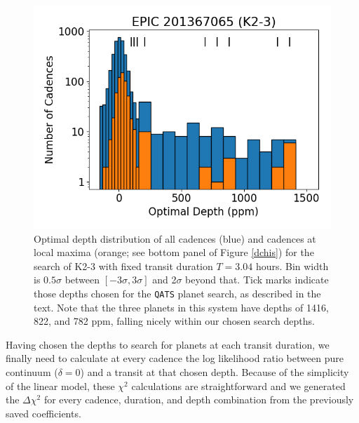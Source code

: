\documentclass[twocolumn]{aastex62}
\newcommand{\pipeline}[1]{\texttt{#1}}
\begin{document}
\begin{figure}[tbp]
\includegraphics[width=\columnwidth]{optimal_depths.png}
\caption{Optimal depth distribution of all cadences (blue) and
  cadences at local maxima (orange; see bottom panel of Figure
  \ref{dchis}) for the search of K2-3 with fixed transit duration
  $T=3.04$ hours. Bin width is $0.5\sigma$ between
  $[-3\sigma,3\sigma]$ and 2$\sigma$ beyond that.  Tick marks indicate
  those depths chosen for the \pipeline{QATS} planet search, as
  described in the text. Note that the three planets in this system
  have depths of 1416, 822, and 782 ppm, falling nicely within our
  chosen search depths.  \label{optdepths}}
\end{figure}

Having chosen the depths to search for planets at each transit
duration, we finally need to calculate at every cadence the log
likelihood ratio between pure continuum ($\delta = 0$) and a transit
at that chosen depth. Because of the simplicity of the linear model,
these $\chi^2$ calculations are straightforward and we generated the
$\Delta\chi^2$ for every cadence, duration, and depth combination from
the previously saved coefficients.
\end{document}
